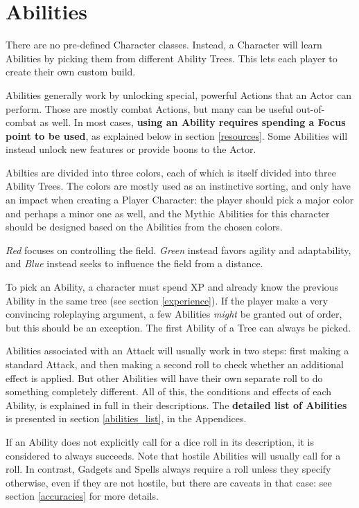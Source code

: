 \chapter{Abilities}

There are no pre-defined Character classes. Instead, a Character will learn Abilities by picking them from different Ability Trees. This lets each player to create their own custom build.

Abilities generally work by unlocking special, powerful Actions that an Actor can perform. Those are mostly combat Actions, but many can be useful out-of-combat as well. In most cases, \textbf{using an Ability requires spending a Focus point to be used}, as explained below in section \ref{resources}. Some Abilities will instead unlock new features or provide boons to the Actor.

\label{abilities}

Abilties are divided into three colors, each of which is itself divided into three Ability Trees. The colors are mostly used as an instinctive sorting, and only have an impact when creating a Player Character: the player should pick a major color and perhaps a minor one as well, and the Mythic Abilities for this character should be designed based on the Abilities from the chosen colors. 

\textit{Red} focuses on controlling the field. \textit{Green} instead favors agility and adaptability, and \textit{Blue} instead seeks to influence the field from a distance.

To pick an Ability, a character must spend XP and already know the previous Ability in the same tree (see section \ref{experience}). If the player make a very convincing roleplaying argument, a few Abilities \textit{might} be granted out of order, but this should be an exception. The first Ability of a Tree can always be picked.

Abilities associated with an Attack will usually work in two steps: first making a standard Attack, and then making a second roll to check whether an additional effect is applied. But other Abilities will have their own separate roll to do something completely different. All of this, the conditions and effects of each Ability, is explained in full in their descriptions. The \textbf{detailed list of Abilities} is presented in section \ref{abilities_list}, in the Appendices. 


If an Ability does not explicitly call for a dice roll in its description, it is considered to always succeeds. Note that hostile Abilities will usually call for a roll. In contrast, Gadgets and Spells always require a roll unless they specify otherwise, even if they are not hostile, but there are caveats in that case: see section \ref{accuracies} for more details.



